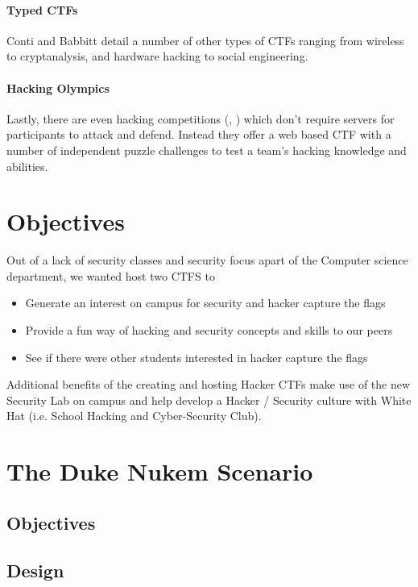 \documentclass[10pt]{article}
\begin{document}
\paragraph*{Typed CTFs} Conti and Babbitt
\cite{HackingCompetitionsForSecurityEducation} detail a number of other types
of CTFs ranging from wireless to cryptanalysis, and hardware hacking to social
engineering.

\paragraph*{Hacking Olympics} Lastly, there are even hacking competitions
(\cite{Cipher}, \cite{SMPCTF}) which don't require servers for participants to
attack and defend. Instead they offer a web based CTF with a number of
independent puzzle challenges to test a team's hacking knowledge and abilities.

\section{Objectives}
Out of a lack of security classes and security focus apart of the Computer science
department, we wanted host two CTFS to

\begin{itemize}
\item Generate an interest on campus for security and hacker capture the flags
\item Provide a fun way  of hacking and security concepts and skills to our peers
\item See if there were other students interested in hacker capture the flags
\end{itemize}

Additional benefits of the creating and hosting Hacker CTFs make use of the new
Security Lab on campus and help develop a Hacker / Security culture with White
Hat (i.e. School Hacking and Cyber-Security Club).

\section{The Duke Nukem Scenario}

\subsection{Objectives}


\subsection{Design}
\end{document}
